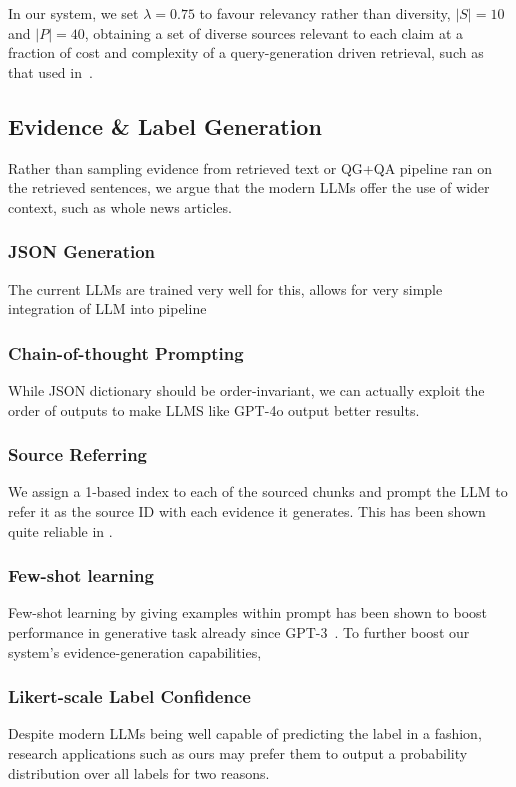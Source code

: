 In our system, we set $\lambda=0.75$ to favour relevancy rather than diversity, $|S|=10$ and $|P| = 40$, obtaining a set of diverse sources relevant to each claim at a fraction of cost and complexity of a query-generation driven retrieval, such as that used in~\cite{averitec2024}.

\subsection{Evidence \& Label Generation}
\label{sec:generation}
Rather than sampling evidence from retrieved text or QG+QA pipeline ran on the retrieved sentences, we argue that the modern LLMs offer the use of wider context, such as whole news articles.

\subsubsection{JSON Generation}
The current LLMs are trained very well for this, allows for very simple integration of LLM into pipeline

\subsubsection{Chain-of-thought Prompting}
While JSON dictionary should be order-invariant, we can actually exploit the order of outputs to make LLMS like GPT-4o output better results.~\cite{cot}

\subsubsection{Source Referring}
We assign a 1-based index to each of the sourced chunks and prompt the LLM to refer it as the source ID with each evidence it generates.
This has been shown quite reliable in \cite{menick2022teachinglanguagemodelssupport}.

\subsubsection{Few-shot learning}
Few-shot learning by giving examples within prompt has been shown to boost performance in generative task already since GPT-3~\cite{fewshot}.
To further boost our system's evidence-generation capabilities, 

\subsubsection{Likert-scale Label Confidence}
\label{likert}
Despite modern LLMs being well capable of predicting the label in a  fashion, research applications such as ours may prefer them to output a probability distribution over all labels for two reasons.

